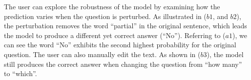 The user can explore the robustness of the model by examining how the prediction varies when the question is perturbed.
%
As illustrated in ($b1$, and $b2$), the perturbation removes the word ``partial'' in the original sentence, which leads the model to produce a different yet correct answer (``No''). Referring to ($a1$), we can see the word ``No'' exhibits the second highest probability for the original question.
%
The user can also manually edit the text. As shown in ($b3$), the model still produces the correct answer when changing the question from ``how many'' to ``which''.

